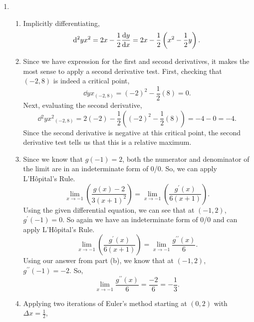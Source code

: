 \begin{enumerate}
	\item \begin{enumerate}
		\item Implicitly differentiating,
			\begin{equation*}
				\mathrm{d} ^2y{x^2} = 2x - \frac{1}{2}\frac{\mathrm{d} y}{\mathrm{d} x} = 2x - \frac{1}{2}\left(x^2 - \frac{1}{2}y\right).
			\end{equation*}
		\item Since we have expression for the first and second derivatives, it makes the most sense to apply a second derivative test.
			First, checking that $(-2,8)$ is indeed a critical point,
			\begin{equation*}
				\dd{y}{x}_{(-2,8)} = (-2)^2 - \frac{1}{2}(8) = 0.
			\end{equation*}
			Next, evaluating the second derivative,
			\begin{equation*}
				\dd{^2y}{x^2}_{(-2,8)} = 2(-2) - \frac{1}{2}\left((-2)^2 - \frac{1}{2}(8)\right) = -4 - 0 = -4.
			\end{equation*}
			Since the second derivative is negative at this critical point, the second derivative test tells us that this is a relative maximum.
		\item Since we know that $g(-1)=2$, both the numerator and denominator of the limit are in an indeterminate form of 0/0.
			So, we can apply L'H\^{o}pital's Rule.
			\begin{equation*}
				\lim_{x\to -1}{\left(\frac{g(x)-2}{3(x+1)^2}\right)} = \lim_{x\to-1}\left(\frac{g^\prime(x)}{6(x+1)}\right).
			\end{equation*}
			Using the given differential equation, we can see that at $(-1,2)$, $g^\prime(-1)=0$.
			So again we have an indeterminate form of 0/0 and can apply L'H\^{o}pital's Rule.
			\begin{equation*}
				\lim_{x\to-1}\left(\frac{g^\prime(x)}{6(x+1)}\right) = \lim_{x\to -1}{\frac{g^{\prime\prime}(x)}{6}}.
			\end{equation*}
			Using our answer from part (b), we know that at $(-1,2)$, $g^{\prime\prime}(-1) = -2$.
			So,
			\begin{equation*}
				\lim_{x\to -1}{\frac{g^{\prime\prime}(x)}{6}} = \frac{-2}{6} = -\frac{1}{3}.
			\end{equation*}
		\item Applying two iterations of Euler's method starting at $(0,2)$ with $\Delta x = \frac{1}{2}$,
			\begin{table}[H]
				\begin{center}
					\begin{tabular}{|c|c|c|c|c|}

\end{tabular}
\end{center}
\end{table}
\end{enumerate}
\end{enumerate}
